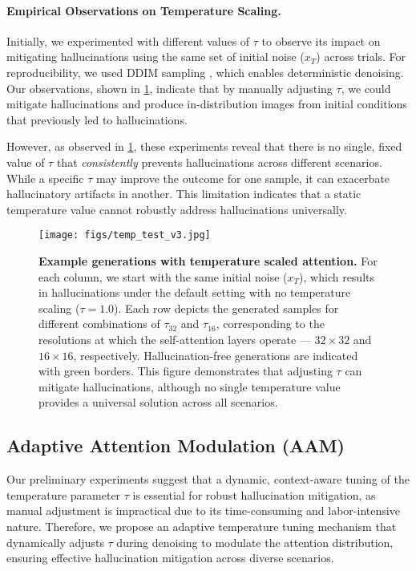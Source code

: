 \paragraph{Empirical Observations on Temperature Scaling.}
Initially, we experimented with different values of $\tau$ to observe its impact on mitigating hallucinations using the same set of initial noise ($x_T$) across trials. 
For reproducibility, we used DDIM sampling \citep{song2020ddim}, which enables deterministic denoising. 
Our observations, shown in \cref{fig:temp_test}, indicate that by manually adjusting $\tau$, we could mitigate hallucinations and produce in-distribution images from initial conditions that previously led to hallucinations. 

However, as observed in \cref{fig:temp_test}, these experiments reveal that there is no single, fixed value of $\tau$ that {\it consistently} prevents hallucinations across different scenarios. 
While a specific $\tau$ may improve the outcome for one sample, it can exacerbate hallucinatory artifacts in another. 
This limitation indicates that a static temperature value cannot robustly address hallucinations universally. 

\begin{figure}[t]
    \centering
    \texttt{[image: figs/temp\_test\_v3.jpg]}
    \caption{\textbf{Example generations with temperature scaled attention.} For each column, we start with the same initial noise ($x_T$), which results in hallucinations under the default setting with no temperature scaling (\ie $\tau=1.0$). Each row depicts the generated samples for different combinations of $\tau_{32}$ and $\tau_{16}$, corresponding to the resolutions at which the self-attention layers operate --- $32\times32$ and $16\times 16$, respectively. Hallucination-free generations are indicated with green borders. This figure demonstrates that adjusting $\tau$ can mitigate hallucinations, although no single temperature value provides a universal solution across all scenarios. }
    \label{fig:temp_test}
    \vspace{-8pt}
\end{figure}

\subsection{Adaptive Attention Modulation (AAM)}

Our preliminary experiments suggest that a dynamic, context-aware tuning of the temperature parameter $\tau$ is essential for robust hallucination mitigation, as manual adjustment is impractical due to its time-consuming and labor-intensive nature. 
Therefore, we propose an adaptive temperature tuning mechanism that dynamically adjusts $\tau$ during denoising to modulate the attention distribution, ensuring effective hallucination mitigation across diverse scenarios. 

